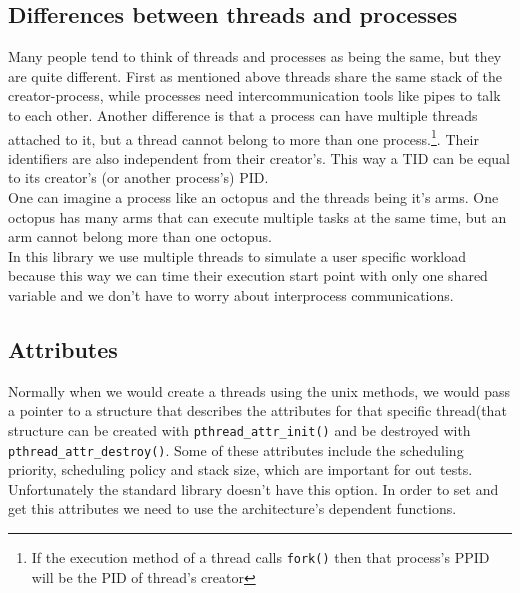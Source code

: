\subsection{Differences between threads and processes} 
Many people tend to think of threads and processes as being the same, but they are quite different. First as mentioned above threads share the same stack of the creator-process, while processes need intercommunication tools like pipes to talk to each other. Another difference is that a process can have multiple threads attached to it, but a thread cannot belong to more than one process.\footnote{If the execution method of a thread calls \texttt{fork()} then that process's PPID will be the PID of thread's creator}. Their identifiers are also independent from their creator's. This way a TID can be equal to its creator's (or another process's) PID. \\
One can imagine a process like an octopus and the threads being it's arms. One octopus has many arms that can execute multiple tasks at the same time, but an arm cannot belong more than one octopus.\\
In this library we use multiple threads to simulate a user specific workload because this way we can time their execution start point with only one shared variable and we don't have to worry about interprocess communications. 
\subsection{Attributes}
Normally when we would create a threads using the unix methods, we would pass a pointer to a
structure that describes the attributes for that specific thread(that structure can be created with 
\texttt{pthread\_attr\_init()} and be destroyed with \texttt{pthread\_attr\_destroy()}. Some of these attributes include the 
scheduling priority, scheduling policy and stack size, which are important for out tests. 
Unfortunately the standard library doesn't have this option. In order to set and get this attributes
we need to use the architecture's dependent functions. 
